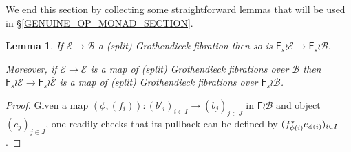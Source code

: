 \documentclass[a4paper,10pt
,draft
]{article}%
\numberwithin{equation}{section}
\numberwithin{figure}{section}
\newtheorem{lemma}[equation]{Lemma}%
\theoremstyle{definition} %
\newcommand{\Fin}{\mathsf{F}}%
\newcommand{\1}{\ensuremath{\mathbbm 1}}%
\begin{document}
We end this section by collecting some straightforward lemmas
that will be used in \S \ref{GENUINE_OP_MONAD_SECTION}.

\begin{lemma}\label{FWRGROTH LEM}
	If $\mathcal{E} \to \mathcal{B}$ a (split) Grothendieck fibration then so is 
	$\Fin_s \wr \mathcal{E} \to \Fin_s \wr \mathcal{B}$.

	Moreover, if 
	$\mathcal{E} \to \bar{\mathcal{E}}$ is a map of (split) Grothendieck fibrations over $\mathcal{B}$ then
	$\Fin_s \wr \mathcal{E} \to \Fin_s \wr \bar{\mathcal{E}}$ is a map of (split) Grothendieck fibrations over $\Fin_s \wr \mathcal{B}$.
\end{lemma}

\begin{proof}
Given a map 
$(\phi,(f_i)) \colon
(b'_i)_{i \in I} \to (b_j)_{j \in J}$ 
in $\Fin \wr \mathcal{B}$ and object $(e_j)_{j \in J}$,
one readily checks that its pullback can be defined by $(f^{\**}_{\phi(i)}e_{\phi(i)})_{i \in I}$.
\end{proof}
\end{document}
